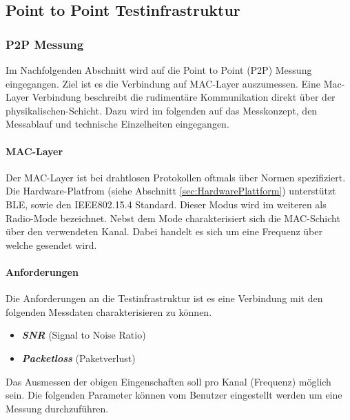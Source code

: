 \vspace*{4cm}
\begin{center}
\part{Point to Point Testinfrastruktur}\label{PointtoPointTestinfrastruktur}
\end{center}
\vspace*{\fill}
\clearpage

\section{P2P Messung}\label{sec:P2PMessung}

Im Nachfolgenden Abschnitt wird auf die Point to Point (P2P) Messung eingegangen. Ziel ist es die Verbindung auf MAC-Layer auszumessen. Eine Mac-Layer Verbindung beschreibt die rudimentäre Kommunikation direkt über der physikalischen-Schicht. Dazu wird im folgenden auf das Messkonzept, den Messablauf und technische Einzelheiten eingegangen. 

\subsection{MAC-Layer}\label{sec:MAC-LayerP2P}

Der MAC-Layer ist bei drahtlosen Protokollen oftmals über Normen spezifiziert. Die Hardware-Platfrom (siehe Abschnitt \ref{sec:HardwarePlattform}) unterstützt BLE, sowie den IEEE802.15.4 Standard. Dieser Modus wird im weiteren als Radio-Mode bezeichnet. Nebst dem Mode charakterisiert sich die MAC-Schicht über den verwendeten Kanal. Dabei handelt es sich um eine Frequenz über welche gesendet wird. 

\subsection{Anforderungen}\label{sec:AnforderungentP2P}

Die Anforderungen an die Testinfrastruktur ist es eine Verbindung mit den folgenden Messdaten charakterisieren zu können. 

\begin{itemize}
	\item \textit{\textbf{SNR}} (Signal to Noise Ratio)
	\item \textit{\textbf{Packetloss}} (Paketverlust)
\end{itemize}

Das Ausmessen der obigen Eingenschaften soll pro Kanal (Frequenz) möglich sein. Die folgenden Parameter können vom Benutzer eingestellt werden um eine Messung durchzuführen.

